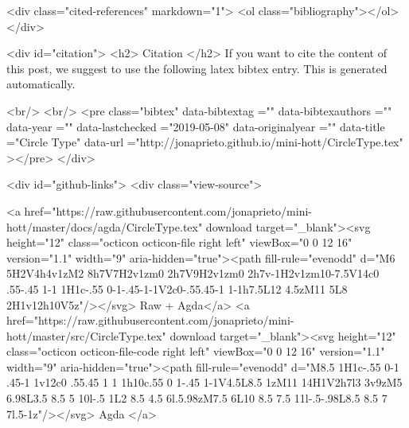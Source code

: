   <div class="cited-references" markdown="1">
  <ol class="bibliography"></ol>
  </div>


  
  <div id="citation">
  <h2> Citation </h2>
  If you want to cite the content of this post,
  we suggest to use the following latex bibtex entry.
  This is generated automatically.

  <br/>
  <br/>
  <pre class="bibtex"
       data-bibtextag =""
       data-bibtexauthors =""
       data-year =""
       data-lastchecked ="2019-05-08"
       data-originalyear =""
       data-title ="Circle Type"
       data-url ="http://jonaprieto.github.io/mini-hott/CircleType.tex"
  ></pre>
  </div>
  

  <div id="github-links">
    <div class="view-source">
      
        <a href="https://raw.githubusercontent.com/jonaprieto/mini-hott/master/docs/agda/CircleType.tex" download target="_blank"><svg height="12" class="octicon octicon-file right left" viewBox="0 0 12 16" version="1.1" width="9" aria-hidden="true"><path fill-rule="evenodd" d="M6 5H2V4h4v1zM2 8h7V7H2v1zm0 2h7V9H2v1zm0 2h7v-1H2v1zm10-7.5V14c0 .55-.45 1-1 1H1c-.55 0-1-.45-1-1V2c0-.55.45-1 1-1h7.5L12 4.5zM11 5L8 2H1v12h10V5z"/></svg> Raw + Agda</a>
        <a href="https://raw.githubusercontent.com/jonaprieto/mini-hott/master/src/CircleType.tex" download target="_blank"><svg height="12" class="octicon octicon-file-code right left" viewBox="0 0 12 16" version="1.1" width="9" aria-hidden="true"><path fill-rule="evenodd" d="M8.5 1H1c-.55 0-1 .45-1 1v12c0 .55.45 1 1 1h10c.55 0 1-.45 1-1V4.5L8.5 1zM11 14H1V2h7l3 3v9zM5 6.98L3.5 8.5 5 10l-.5 1L2 8.5 4.5 6l.5.98zM7.5 6L10 8.5 7.5 11l-.5-.98L8.5 8.5 7 7l.5-1z"/></svg> Agda </a>
      
